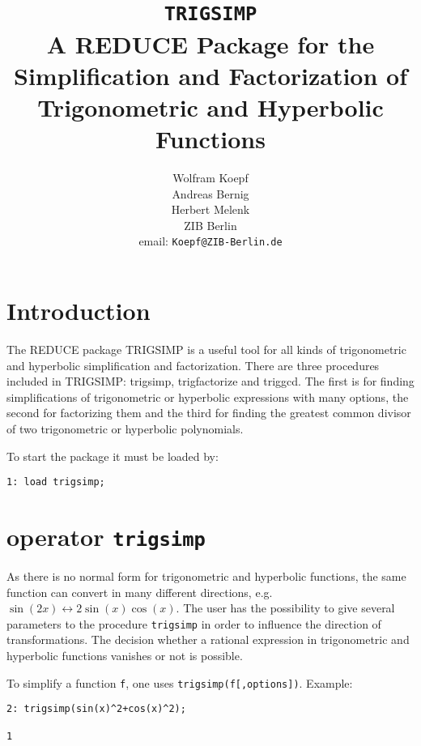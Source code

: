 \title{{\tt TRIGSIMP}\\
A REDUCE Package for the Simplification and Factorization of Trigonometric
and Hyperbolic Functions}
\date{}
\author{Wolfram Koepf\\
        Andreas Bernig\\
        Herbert Melenk\\
        ZIB Berlin \\
        email: {\tt  Koepf@ZIB-Berlin.de}}

\maketitle
\section{Introduction}

The REDUCE package TRIGSIMP is a useful tool for all kinds of trigonometric and
hyperbolic simplification and factorization. There are three
procedures included in TRIGSIMP: trigsimp, trigfactorize and triggcd.
The first is for finding simplifications of trigonometric or
hyperbolic expressions with many options, the second for factorizing
them and the third
for finding the greatest common divisor of two trigonometric or
hyperbolic polynomials.

To start the package it must be loaded by:
{\small
\begin{verbatim}
1: load trigsimp;
\end{verbatim}
}\noindent

\section{\REDUCE{} operator {\tt trigsimp}}

As there is no normal form for trigonometric and hyperbolic functions, the same
function can convert in many different directions, e.g.
$\sin(2x) \leftrightarrow 2\sin(x)\cos(x)$.
The user has the possibility to give several parameters to the
procedure {\tt trigsimp} in order to influence the direction of transformations.
The decision whether a rational expression in trigonometric
and hyperbolic functions vanishes or not is possible.

To simplify a function {\tt f}, one uses {\tt trigsimp(f[,options])}. Example:
{\small
\begin{verbatim}
2: trigsimp(sin(x)^2+cos(x)^2);

1
\end{verbatim}
}\noindent

